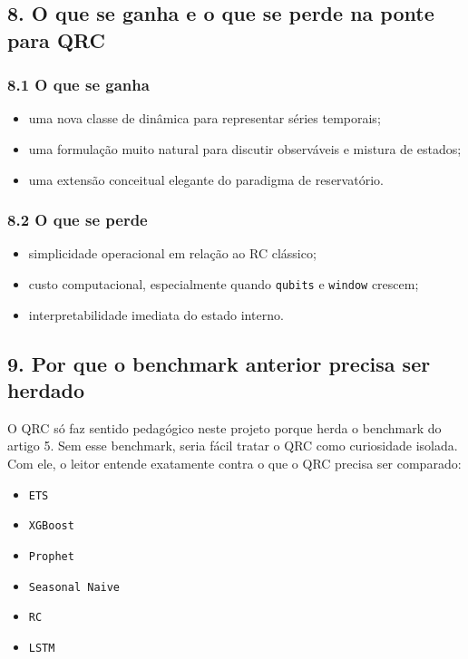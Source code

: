 \documentclass[12pt]{article}
\providecommand{\tightlist}{%
  \setlength{\itemsep}{0pt}\setlength{\parskip}{0pt}}
\begin{document}
\subsection{8. O que se ganha e o que se perde na ponte para QRC}\label{8-o-que-se-ganha-e-o-que-se-perde-na-ponte-para-qrc}

\subsubsection{8.1 O que se ganha}\label{81-o-que-se-ganha}

\begin{itemize}
\tightlist
\item
  uma nova classe de dinâmica para representar séries temporais;
\item
  uma formulação muito natural para discutir observáveis e mistura de estados;
\item
  uma extensão conceitual elegante do paradigma de reservatório.
\end{itemize}

\subsubsection{8.2 O que se perde}\label{82-o-que-se-perde}

\begin{itemize}
\tightlist
\item
  simplicidade operacional em relação ao RC clássico;
\item
  custo computacional, especialmente quando \texttt{qubits} e \texttt{window} crescem;
\item
  interpretabilidade imediata do estado interno.
\end{itemize}

\subsection{9. Por que o benchmark anterior precisa ser herdado}\label{9-por-que-o-benchmark-anterior-precisa-ser-herdado}

O QRC só faz sentido pedagógico neste projeto porque herda o benchmark do artigo 5. Sem esse benchmark, seria fácil tratar o QRC como curiosidade isolada. Com ele, o leitor entende exatamente contra o que o QRC precisa ser comparado:

\begin{itemize}
\tightlist
\item
  \texttt{ETS}
\item
  \texttt{XGBoost}
\item
  \texttt{Prophet}
\item
  \texttt{Seasonal\ Naive}
\item
  \texttt{RC}
\item
  \texttt{LSTM}
\end{itemize}
\end{document}
